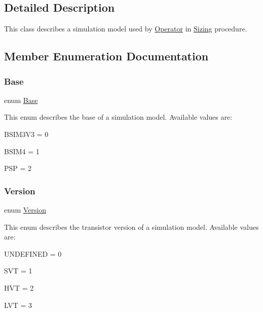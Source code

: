 \subsection{Detailed Description}
This class describes a simulation model used by \mbox{\hyperlink{class_open_chams_1_1_operator}{Operator}} in \mbox{\hyperlink{class_open_chams_1_1_sizing}{Sizing}} procedure. 

\subsection{Member Enumeration Documentation}
\mbox{\label{class_open_chams_1_1_simul_model_a450696a95d6cb29d7723838846948340}} 
\subsubsection{\texorpdfstring{Base}{Base}}
{\footnotesize\ttfamily enum \mbox{\hyperlink{class_open_chams_1_1_simul_model_a450696a95d6cb29d7723838846948340}{Base}}}

This enum describes the base of a simulation model. Available values are\+:
\begin{DoxyItemize}
\item B\+S\+I\+M3\+V3 = 0
\item B\+S\+I\+M4 = 1
\item P\+SP = 2 
\end{DoxyItemize}\mbox{\label{class_open_chams_1_1_simul_model_a2256f5bba1c1c69a92b933aa501df470}} 
\subsubsection{\texorpdfstring{Version}{Version}}
{\footnotesize\ttfamily enum \mbox{\hyperlink{class_open_chams_1_1_simul_model_a2256f5bba1c1c69a92b933aa501df470}{Version}}}

This enum describes the transistor version of a simulation model. Available values are\+:
\begin{DoxyItemize}
\item U\+N\+D\+E\+F\+I\+N\+ED = 0
\item S\+VT = 1
\item H\+VT = 2
\item L\+VT = 3 
\end{DoxyItemize}

